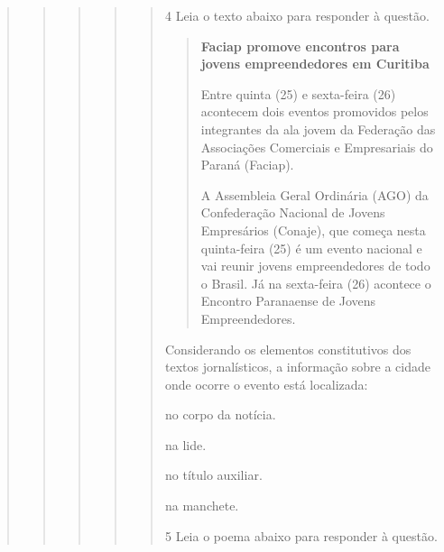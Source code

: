 \begin{quote}
\begin{quote}
\begin{quote}
\begin{quote}
\begin{quote}
\num{4} Leia o texto abaixo para responder à questão. 

\begin{quote}

\textbf{Faciap promove encontros para jovens empreendedores em Curitiba}

Entre quinta (25) e sexta-feira (26) acontecem dois eventos promovidos
pelos integrantes da ala jovem da Federação das Associações Comerciais e
Empresariais do Paraná (Faciap).

A Assembleia Geral Ordinária (AGO) da Confederação Nacional de Jovens
Empresários (Conaje), que começa nesta quinta-feira (25) é um evento
nacional e vai reunir jovens empreendedores de todo o Brasil. Já na
sexta-feira (26) acontece o Encontro Paranaense de Jovens
Empreendedores.

\end{quote}


Considerando os elementos constitutivos dos textos jornalísticos, a
informação sobre a cidade onde ocorre o evento está localizada:

\begin{escolha}
  
  \item no corpo da notícia.
  
  \item na lide.
  
  \item no título auxiliar.
  
  \item na manchete.

\end{escolha}


\num{5} Leia o poema abaixo para responder à questão. 

\begin{quote}
\begin{verse}


\end{verse}
\end{quote}
\end{quote}
\end{quote}
\end{quote}
\end{quote}
\end{quote}
